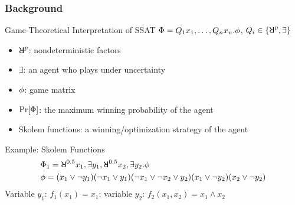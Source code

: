 \begin{frame}
    \frametitle{Background}
    \begin{block}{Game-Theoretical Interpretation of SSAT}
        $\Phi=Q_1 x_1,\ldots,Q_n x_n.\phi$, $Q_i \in \{\random{p},\exists\}$
        \pause
        \begin{itemize}
            \item $\random{p}$: nondeterministic factors
                  \pause
            \item $\exists$: an agent who plays under uncertainty
                  \pause
            \item $\phi$: game matrix
                  \pause
            \item $\Pr[\Phi]$: the maximum winning probability of the agent
                  \pause
            \item \alert{Skolem functions}: a winning/optimization strategy of the agent
        \end{itemize}
    \end{block}\pause
    \begin{block}{Example: Skolem Functions}
        \abovedisplayskip=0pt
        \begin{align*}
             & \Qf_1=\random{0.5} x_1, \exists y_1, \random{0.5} x_2, \exists y_2. \pf \\
             & \pf=(x_1 \lor \lnot y_1)
            (\lnot x_1 \lor y_1)
            (\lnot x_1 \lor \lnot x_2 \lor y_2)
            (x_1 \lor \lnot y_2)
            (x_2 \lor \lnot y_2)
        \end{align*}
        \pause
        Variable $y_1$: $f_1(x_1)=x_1$;
        variable $y_2$: $f_2(x_1,x_2)=x_1 \land x_2$
    \end{block}
\end{frame}